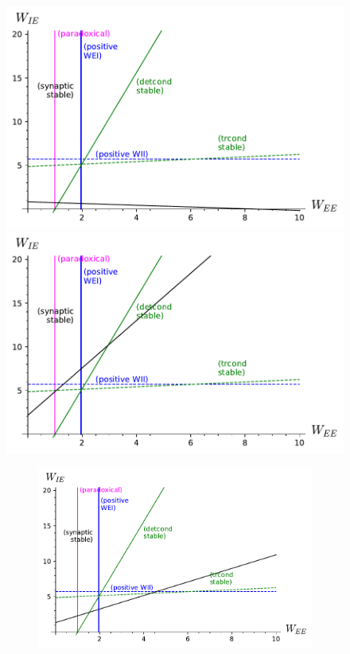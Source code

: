 \documentclass[
twocolumn,
]{article}
\begin{document}
\begin{figure}[!ht]
\centering
\parbox[c]{\columnwidth}{
\includegraphics[width=\columnwidth]{TF_stability_slowHomeo.pdf}
\includegraphics[width=\columnwidth]{TF_stability_slowCross.pdf}}
\parbox[c]{\columnwidth}{
\begin{figure}[H]
\includegraphics[width=\columnwidth]{TF_stability_similar.pdf}

\end{figure}}
\end{figure}
\end{document}
